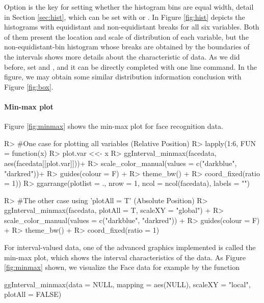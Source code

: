 \documentclass[article]{jss}
\begin{document}
Option  is the key for setting whether the histogram bins are equal width, detail in Section \ref{sec:hist}, which can be set with  or . In Figure \ref{fig:hist} depicts the histograms with equidistant and non-equidistant breaks for all six variables. Both of them present the location and scale of distribution of each variable, but the non-equidistant-bin histogram whose breaks are obtained by the boundaries of the intervals shows more details about the characteristic of data. As we did before, set  and , and it can be directly completed with one line command. In the figure, we may obtain some similar distribution information conclusion with Figure \ref{fig:box}.


\paragraph{Min-max plot}
Figure \ref{fig:minmax} shows the min-max plot for face recognition data.
\begin{CodeChunk}
\begin{CodeInput}
R> #One case for plotting all variables (Relative Position)
R> lapply(1:6, FUN = function(x){
R>   plot.var <<- x
R>   ggInterval_minmax(facedata, aes(facedata[[plot.var]]))+
R>     scale_color_manual(values = c("darkblue", "darkred"))+
R>     guides(colour = F) + 
R>     theme_bw() + 
R>     coord_fixed(ratio = 1)}) %
R>   ggarrange(plotlist = ., nrow = 1, ncol = ncol(facedata), labels = "")

R> #The other case using 'plotAll = T' (Absolute Position)
R> ggInterval_minmax(facedata, plotAll = T, scaleXY = "global") +
R>   scale_color_manual(values = c("darkblue", "darkred")) +
R>                guides(colour = F) + 
R>                theme_bw() + 
R>                coord_fixed(ratio = 1)
\end{CodeInput}
\end{CodeChunk}

For interval-valued data, one of the advanced graphics implemented is called the min-max plot, which shows the interval characteristics of the data. As Figure \ref{fig:minmax} shown, we visualize the Face data for example by the function 



\begin{CodeChunk}
\begin{CodeInput}
ggInterval_minmax(data = NULL, mapping = aes(NULL), scaleXY = "local",
  plotAll = FALSE)
\end{CodeInput}
\end{CodeChunk}
\end{document}
